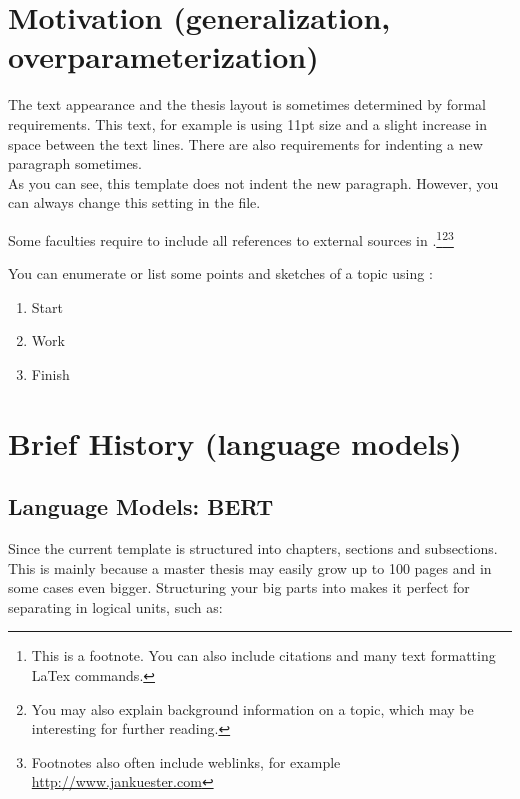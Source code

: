 \section{Motivation (generalization, overparameterization)}

The text appearance and the thesis layout is sometimes determined by formal requirements. This text, for example is  using 11pt size and a slight increase in space between the text lines. There are also requirements for indenting a new paragraph sometimes.\\
As you can see, this template does not indent the new paragraph. However, you can always change this setting in the  file.\\
\ThinHRule

Some faculties require to include all references to external sources in .\footnote{ This is a footnote. You can also include citations and many text formatting LaTex commands.}\footnote{ You may also explain background information on a topic, which may be interesting for further reading.}\footnote{ Footnotes also often include weblinks, for example \url{http://www.jankuester.com}}\\
\ThinHRule

You can enumerate or list some points and sketches of a topic using :

\begin{enumerate}
	\item Start
	\item Work
	\item Finish
\end{enumerate}


\section{Brief History (language models)}

\subsection{Language Models: BERT}
Since the current template is structured into chapters, sections and subsections. This is mainly because a master thesis may easily grow up to 100 pages and in some cases even bigger. Structuring your big parts into  makes it perfect for separating in logical units, such as:

